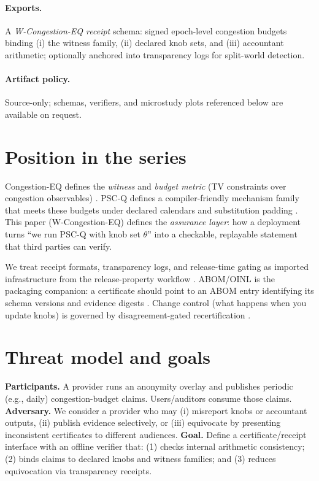 \documentclass[11pt]{article}
\begin{document}
\paragraph{Exports.}
A \emph{W-Congestion-EQ receipt} schema: signed epoch-level congestion budgets binding (i) the witness family, (ii) declared knob sets, and (iii) accountant arithmetic; optionally anchored into transparency logs for split-world detection.

\paragraph{Artifact policy.}
Source-only; schemas, verifiers, and microstudy plots referenced below are available on request.\cite{series:artifactpolicy}

\section{Position in the series}
Congestion-EQ defines the \emph{witness} and \emph{budget metric} (TV constraints over congestion observables) \cite{series:congeq}.
PSC-Q defines a compiler-friendly mechanism family that meets these budgets under declared calendars and substitution padding \cite{series:pscq}.
This paper (W-Congestion-EQ) defines the \emph{assurance layer}: how a deployment turns ``we run PSC-Q with knob set $\theta$'' into a checkable, replayable statement that third parties can verify.

We treat receipt formats, transparency logs, and release-time gating as imported infrastructure from the release-property workflow \cite{series:release}.
ABOM/OINL is the packaging companion: a certificate should point to an ABOM entry identifying its schema versions and evidence digests \cite{series:abom}.
Change control (what happens when you update knobs) is governed by disagreement-gated recertification \cite{series:recert}.

\section{Threat model and goals}
\textbf{Participants.}
A provider runs an anonymity overlay and publishes periodic (e.g., daily) congestion-budget claims.
Users/auditors consume those claims.
\textbf{Adversary.}
We consider a provider who may (i) misreport knobs or accountant outputs, (ii) publish evidence selectively, or (iii) equivocate by presenting inconsistent certificates to different audiences.
\textbf{Goal.}
Define a certificate/receipt interface with an offline verifier that:
(1) checks internal arithmetic consistency; (2) binds claims to declared knobs and witness families; and (3) reduces equivocation via transparency receipts.
\end{document}
